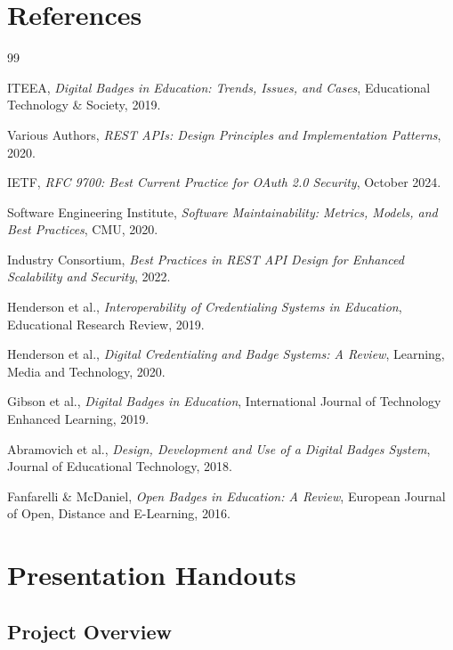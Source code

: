 \documentclass[12pt,a4paper]{article}
\begin{document}
\newpage

\section{References}

\begin{thebibliography}{99}

ITEEA, \textit{Digital Badges in Education: Trends, Issues, and Cases}, Educational Technology \& Society, 2019.

Various Authors, \textit{REST APIs: Design Principles and Implementation Patterns}, 2020.

IETF, \textit{RFC 9700: Best Current Practice for OAuth 2.0 Security}, October 2024.

Software Engineering Institute, \textit{Software Maintainability: Metrics, Models, and Best Practices}, CMU, 2020.

Industry Consortium, \textit{Best Practices in REST API Design for Enhanced Scalability and Security}, 2022.

Henderson et al., \textit{Interoperability of Credentialing Systems in Education}, Educational Research Review, 2019.

Henderson et al., \textit{Digital Credentialing and Badge Systems: A Review}, Learning, Media and Technology, 2020.

Gibson et al., \textit{Digital Badges in Education}, International Journal of Technology Enhanced Learning, 2019.

Abramovich et al., \textit{Design, Development and Use of a Digital Badges System}, Journal of Educational Technology, 2018.

Fanfarelli \& McDaniel, \textit{Open Badges in Education: A Review}, European Journal of Open, Distance and E-Learning, 2016.

\end{thebibliography}

\newpage

\section{Presentation Handouts}

\subsection{Project Overview}
\end{document}
